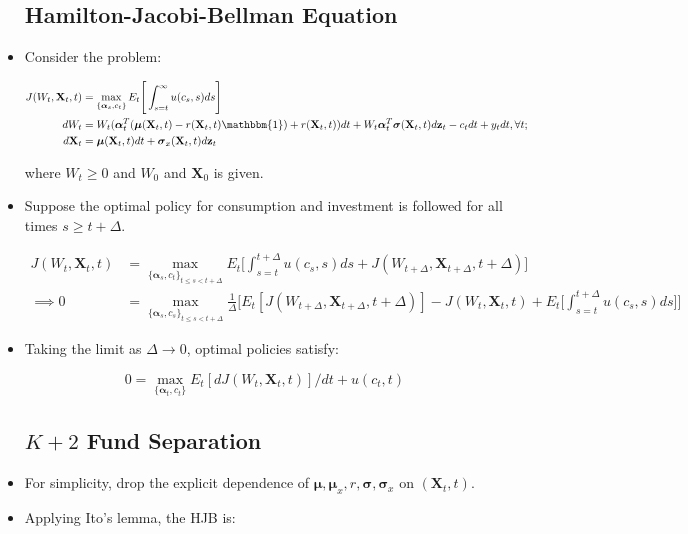 \documentclass{article}
\newcommand{\Xbf}{\mathbf{X}}
\newcommand{\zbf}{\mathbf{z}}
\newcommand{\mubf}{\boldsymbol{\mu}}
\newcommand{\alphabf}{\boldsymbol{\alpha}}
\newcommand{\sigmabf}{\boldsymbol{\sigma}}
\newcommand{\onebf}{\mathbbm{1}}
\begin{document}
\begin{itemize}

\subsection*{Hamilton-Jacobi-Bellman Equation}

\item Consider the problem: 

\begin{align*}
J(W_t, \Xbf_t, t) &= \max_{\{\alphabf_s, c_t\}} E_t \Bigg[\int_{s=t}^\infty u(c_s, s) ds \Bigg] \\
dW_t &= W_t (\alphabf_t^T (\mubf(\Xbf_t, t) - r(\Xbf_t, t)\onebf) + r(\Xbf_t, t))dt + W_t \alphabf_t^T \sigmabf(\Xbf_t, t) d\zbf_t - c_t dt + y_t dt, \forall t;\\
d\Xbf_t &= \mubf(\Xbf_t, t) dt + \sigmabf_x(\Xbf_t, t) d\zbf_t
\end{align*}

where $W_t \ge 0$ and $W_0$ and $\Xbf_0$ is given.

\item Suppose the optimal policy for consumption and investment is followed for all times $s \ge t + \Delta$.

\begin{align*}
J(W_t, \Xbf_t, t) &= \max_{\{\alphabf_s, c_t\}_{t \le s < t + \Delta}} E_t \Bigg[ \int_{s=t}^{t + \Delta} u(c_s, s) ds + J(W_{t+\Delta}, \Xbf_{t + \Delta}, t + \Delta) \Bigg] \\
\implies 0 &= \max_{{\{\alphabf_s, c_s\}}_{t \le s < t + \Delta}} \frac{1}{\Delta} \Bigg[ E_t[ J(W_{t+\Delta}, \Xbf_{t + \Delta}, t + \Delta) ] - J(W_t, \Xbf_t, t) + E_t\Bigg[ \int_{s=t}^{t + \Delta} u(c_s, s) ds \Bigg]\Bigg]
\end{align*}

\item Taking the limit as $\Delta \to 0$, optimal policies satisfy:

$$
0 = \max_{\{\alphabf_t, c_t\}}E_t [dJ (W_t, \Xbf_t, t)]/dt + u(c_t, t)
$$

\subsection*{$K+2$ Fund Separation}

\item For simplicity, drop the explicit dependence of $\mubf, \mubf_x, r, \sigmabf, \sigmabf_x$ on $(\Xbf_t, t)$.

\item Applying Ito's lemma, the HJB is:


\end{itemize}
\end{document}
